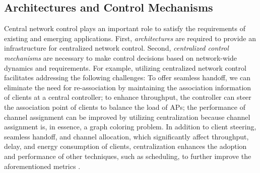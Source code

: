 \subsection{Architectures and Control Mechanisms}
\label{motiv_centralization}
Central network control plays an important role to satisfy the requirements of existing and emerging applications.
First, \textit{architectures} are required to provide an infrastructure for centralized network control. 
Second, \textit{centralized control mechanisms} are necessary to make control decisions based on network-wide dynamics and requirements.
For example, utilizing centralized network control facilitates addressing the following challenges:
To offer seamless handoff, we can eliminate the need for re-association by maintaining the association information of clients at a central controller;
to enhance throughput, the controller can steer the association point of clients to balance the load of APs;
the performance of channel assignment can be improved by utilizing centralization because channel assignment is, in essence, a graph coloring problem.
In addition to client steering, seamless handoff, and channel allocation, which significantly affect throughput, delay, and energy consumption of clients, centralization enhances the adoption and performance of other techniques, such as scheduling, to further improve the aforementioned metrics \cite{zeng2011sofa,REWIMO,liu2014energy,MARS}.











